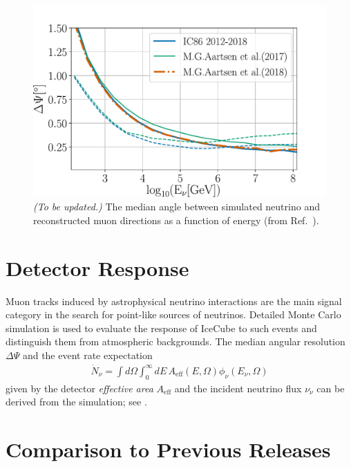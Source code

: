\documentclass[aps,10pt,prd,twocolumn,floats,letterpaper,showpacs,nofootinbib,bibnotes,notitlepage,superscriptaddress,floatfix]{revtex4-1}
\newcommand{\MA}[1]{{\color{magenta}#1}}
\begin{document}
\begin{figure}[t]
\centering
\includegraphics[width=\linewidth]{IC86II_PSF.pdf}
\caption[]{\MA{\it (To be updated.)} The median angle between simulated neutrino and reconstructed muon directions as a function of energy (from Ref.~\cite{Aartsen:2019fau}).}\label{fig:PSF}
\end{figure}

\section{Detector Response}

Muon tracks induced by astrophysical neutrino interactions are the main signal category in the search for point-like sources of neutrinos. Detailed Monte Carlo simulation is used to evaluate the response of IceCube to such events and distinguish them from atmospheric backgrounds. The median angular resolution $\Delta\Psi$ and the event rate expectation
\begin{align}\label{eq:ev_rate}
\dot{N}_\nu=\int d\Omega\int_0^\infty dE\,A_\mathrm{eff}\left(E, \Omega\right) \phi_\nu\left(E_\nu,\Omega\right)
\end{align}
given by the detector \emph{effective area} $A_\mathrm{eff}$ and the incident neutrino flux $\nu_\nu$ can be derived from the simulation; see \cite{Aartsen:2016xlq}.

\section{Comparison to Previous Releases}
\end{document}

